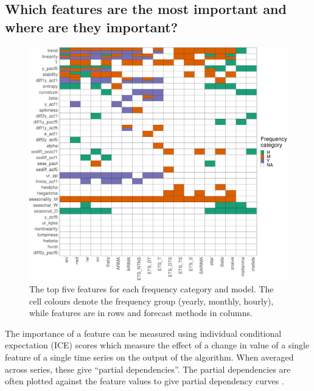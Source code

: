 \documentclass[11pt,a4paper,]{article}
\begin{document}
\hypertarget{which-features-are-the-most-important-and-where-are-they-important}{%
\subsection{Which features are the most important and where are they important?}\label{which-features-are-the-most-important-and-where-are-they-important}}

\begin{figure}

{\centering \includegraphics[width=\textwidth]{figure/viplot-1} 

}

\caption{The top five features for each frequency category and model. The cell colours denote the frequency group (yearly, monthly, hourly), while features are in rows and forecast methods in columns.}\label{fig:viplot}
\end{figure}

The importance of a feature can be measured using individual conditional expectation (ICE) scores \autocite{friedman2008predictive,goldstein2015peeking} which measure the effect of a change in value of a single feature of a single time series on the output of the algorithm. When averaged across series, these give ``partial dependencies''. The partial dependencies are often plotted against the feature values to give partial dependency curves \autocite{Greenwell2018}.
\end{document}
